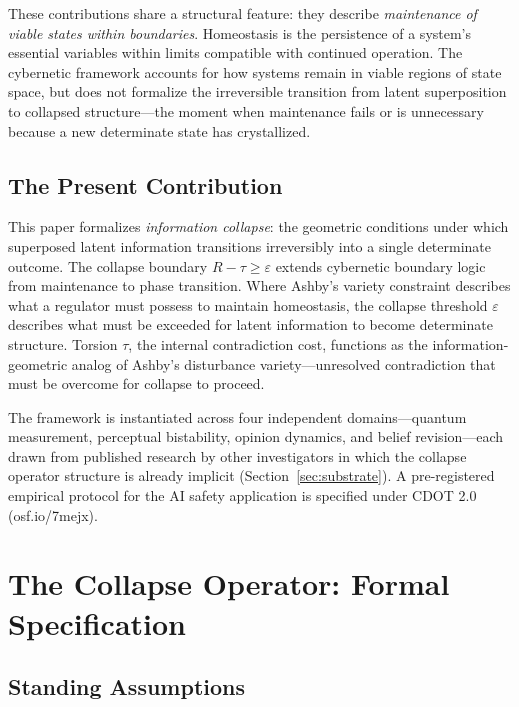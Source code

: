 \documentclass[11pt]{article}
\theoremstyle{plain}
\begin{document}
These contributions share a structural feature: they describe \emph{maintenance of viable states
within boundaries}. Homeostasis is the persistence of a system's essential variables within limits
compatible with continued operation. The cybernetic framework accounts for how systems remain
in viable regions of state space, but does not formalize the irreversible transition from latent
superposition to collapsed structure---the moment when maintenance fails or is unnecessary because
a new determinate state has crystallized.

\subsection{The Present Contribution}

This paper formalizes \emph{information collapse}: the geometric conditions under which superposed
latent information transitions irreversibly into a single determinate outcome. The collapse
boundary $R - \tau \geq \varepsilon$ extends cybernetic boundary logic from maintenance to phase
transition. Where Ashby's variety constraint describes what a regulator must possess to maintain
homeostasis, the collapse threshold $\varepsilon$ describes what must be exceeded for latent
information to become determinate structure. Torsion $\tau$, the internal contradiction cost,
functions as the information-geometric analog of Ashby's disturbance variety---unresolved
contradiction that must be overcome for collapse to proceed.

The framework is instantiated across four independent domains---quantum measurement, perceptual
bistability, opinion dynamics, and belief revision---each drawn from published research by other
investigators in which the collapse operator structure is already implicit
(Section~\ref{sec:substrate}). A pre-registered empirical protocol for the AI safety application is
specified under CDOT 2.0 (osf.io/7mejx).

\section{The Collapse Operator: Formal Specification}

\subsection{Standing Assumptions}
\end{document}

